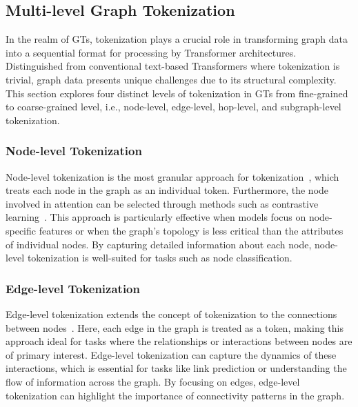 \subsection{Multi-level Graph Tokenization}
\label{architecture:token}



In the realm of GTs, tokenization plays a crucial role in transforming graph data into a sequential format for processing by Transformer architectures. 
Distinguished from conventional text-based Transformers where tokenization is trivial, graph data presents unique challenges due to its structural complexity. This section explores four distinct levels of tokenization in GTs from fine-grained to coarse-grained level, i.e., node-level, edge-level, hop-level, and subgraph-level tokenization.

\subsubsection{Node-level Tokenization}

Node-level tokenization is the most granular approach for tokenization~\cite{Graphormer,10.1145/2939672.2939754}, which
treats each node in the graph as an individual token. Furthermore, the node involved in attention can be selected through methods such as contrastive learning~\cite{chen2024leveraging}.
This approach is particularly effective when models focus on node-specific features or when the graph's topology is less critical than the attributes of individual nodes. 
By capturing detailed information about each node, node-level tokenization is well-suited for tasks such as node classification. 

\subsubsection{Edge-level Tokenization}

Edge-level tokenization extends the concept of tokenization to the connections between nodes~\cite{TokenGT,GraphGPT}. Here, each edge in the graph is treated as a token, making this approach ideal for tasks where the relationships or interactions between nodes are of primary interest. Edge-level tokenization can capture the dynamics of these interactions, which is essential for tasks like link prediction or understanding the flow of information across the graph. By focusing on edges, edge-level tokenization can highlight the importance of connectivity patterns in the graph.



